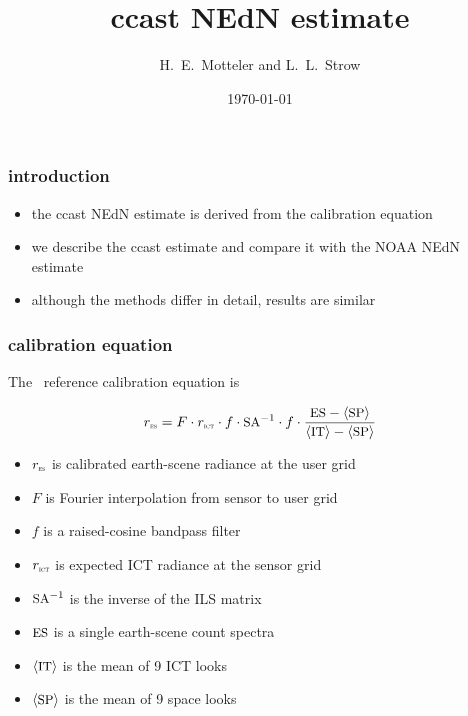 \documentclass[11pt]{beamer}
\title{ccast NEdN estimate}
\author{H.~E.~Motteler and L.~L.~Strow}
\institute{
  UMBC Atmospheric Spectroscopy Lab \\
  Joint Center for Earth Systems Technology \\
}
\date{\today}
\begin{document}
\begin{frame}[plain]
\titlepage
\end{frame}
\begin{frame}
\frametitle{introduction}

\begin{itemize}
  \item the ccast NEdN estimate is derived from the calibration
    equation
  \item we describe the ccast estimate and compare it with the NOAA
    NEdN estimate
  \item although the methods differ in detail, results are similar
\end{itemize}

\end{frame}
\begin{frame}
\frametitle{calibration equation}

The \ccast\ reference calibration equation is

\[r_{\mbox{\tiny\textsc{es}}} = F \cdot r_{\mbox{\tiny\textsc{ict}}} \cdot f \cdot \mbox{\small SA}^{-1}\cdot f \cdot 
         \frac{\mbox{\small ES} - \langle\mbox{\small SP}\rangle}{\langle\mbox{\small IT}\rangle - \langle\mbox{\small SP}\rangle} \]

\begin{itemize}
  \item $r_{\mbox{\tiny\textsc{es}}}$ is calibrated earth-scene radiance at the user grid
  \item $F$ is Fourier interpolation from sensor to user grid
  \item $f$ is a raised-cosine bandpass filter
  \item $r_{\mbox{\tiny\textsc{ict}}}$ is expected ICT radiance at the sensor grid
  \item $\mbox{\small SA}^{-1}$ is the inverse of the ILS matrix
  \item $\mbox{\small ES}$ is a single earth-scene count spectra
  \item $\langle\mbox{\small IT}\rangle$ is the mean of 9 ICT looks
  \item $\langle\mbox{\small SP}\rangle$ is the mean of 9 space looks
\end{itemize}

\end{frame}
% 
\end{document}
